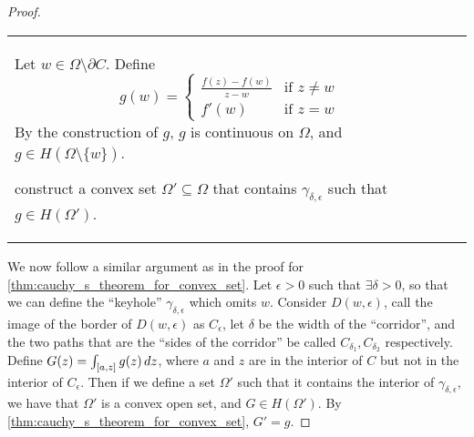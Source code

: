 \documentclass[11pt, oneside]{book}
\begin{document}
\begin{proof}
	$ $ \\
	\begin{tabular}{L{9cm} C{6cm}}
		Let $w \in \Omega \setminus \partial C$. Define
		\begin{equation*}
			g(w) = \begin{cases}
				\frac{f(z) - f(w)}{z - w} & \text{if } z \neq w \\
				f'(w) 	& \text{if } z = w
			\end{cases}
		\end{equation*}
		By the construction of $g$, $g$ is continuous on $\Omega$, and $g \in H(\Omega \setminus \{w\})$.

		 construct a convex set $\Omega' \subseteq \Omega$ that contains $\gamma_{\delta, \epsilon}$ such that $g \in H(\Omega')$.
		&
	\end{tabular}

	We now follow a similar argument as in the proof for \cref{thm:cauchy_s_theorem_for_convex_set}. Let $\epsilon > 0$ such that $\exists \delta > 0$,  so that we can define the ``keyhole'' $\gamma_{\delta, \epsilon}$ which omits $w$. Consider $D(w, \epsilon)$, call the image of the border of $D(w, \epsilon)$ as $C_\epsilon$, let $\delta$ be the width of the ``corridor'', and the two paths that are the ``sides of the corridor'' be called $C_{\delta_1}, C_{\delta_2}$ respectively. Define $G(z) = \int_{[a, z]} g(z) \mathop{}\!d{z}$, where $a$ and $z$ are in the interior of $C$ but not in the interior of $C_\epsilon$. Then if we define a set $\Omega'$ such that it contains the interior of $\gamma_{\delta, \epsilon}$, we have that $\Omega'$ is a convex open set, and $G \in H(\Omega')$. By \cref{thm:cauchy_s_theorem_for_convex_set}, $G' = g$.


\end{proof}
\end{document}
